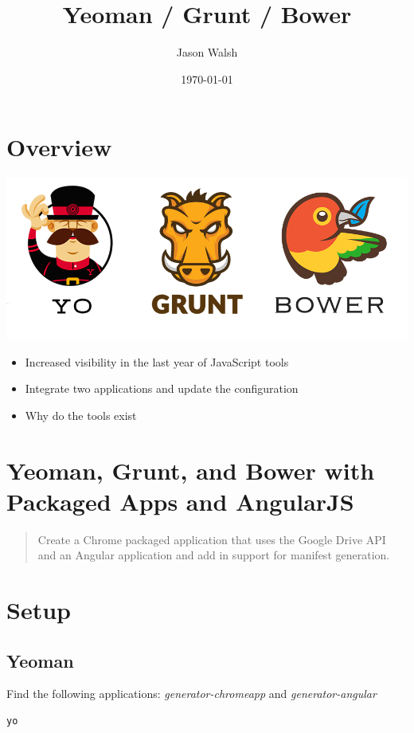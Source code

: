 \documentclass[11pt]{article}
\author{Jason Walsh}
\date{\today}
\title{Yeoman / Grunt / Bower}
\begin{document}
\maketitle

\section*{Overview}
\label{sec-1}

\includegraphics[width=.9\linewidth]{gdg_2013-11-18_yo_grunt_bower/toolset.png}

\begin{itemize}
\item Increased visibility in the last year of JavaScript tools
\item Integrate two applications and update the configuration
\item Why do the tools exist
\end{itemize}
\section*{Yeoman, Grunt, and Bower with Packaged Apps and AngularJS}
\label{sec-2}

\begin{quote}
Create a Chrome packaged application that uses the Google Drive API
and an Angular application and add in support for manifest generation. 
\end{quote}
\section*{Setup}
\label{sec-3}

\subsection*{Yeoman}
\label{sec-3-1}

Find the following applications: \emph{generator-chromeapp} and \emph{generator-angular}

\begin{verbatim}
yo
\end{verbatim}
\end{document}
